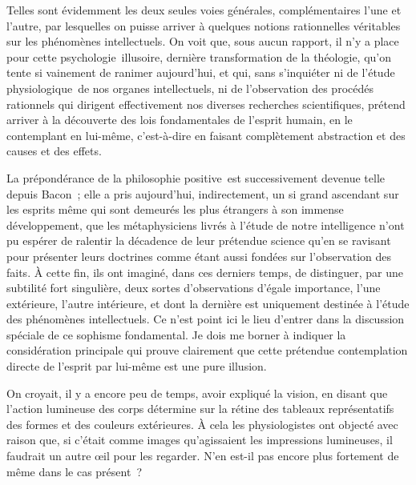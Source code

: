 \documentclass[french,twoside]{book} %
\begin{document}
Telles sont évidemment les deux seules voies générales, complémentaires l’une et l’autre, par lesquelles on puisse arriver à quelques notions rationnelles véritables sur les phénomènes intellectuels. On voit que, sous aucun rapport, il n’y a place pour cette psychologie illusoire, dernière transformation de la théologie, qu’on tente si vainement de ranimer aujourd’hui, et qui, sans s’inquiéter ni de l’étude physiologique de nos organes intellectuels, ni de l’observation des procédés rationnels qui dirigent effectivement nos diverses recherches scientifiques, prétend arriver à la découverte des lois fondamentales de l’esprit humain, en le contemplant en lui-même, c’est-à-dire en faisant complètement abstraction et des causes et des effets.\par
La prépondérance de la philosophie positive est successivement devenue telle depuis Bacon ; elle a pris aujourd’hui, indirectement, un si grand ascendant sur les esprits même qui sont demeurés les plus étrangers à son immense développement, que les métaphysiciens livrés à l’étude de notre intelligence n’ont pu espérer de ralentir la décadence de leur prétendue science qu’en se ravisant pour présenter leurs doctrines comme étant aussi fondées sur l’observation des faits. À cette fin, ils ont imaginé, dans ces derniers temps, de distinguer, par une subtilité fort singulière, deux sortes d’observations d’égale importance, l’une extérieure, l’autre intérieure, et dont la dernière est uniquement destinée à l’étude des phénomènes intellectuels. Ce n’est point ici le lieu d’entrer dans la discussion spéciale de ce sophisme fondamental. Je dois me borner à indiquer la considération principale qui prouve clairement que cette prétendue contemplation directe de l’esprit par lui-même est une pure illusion.\par
On croyait, il y a encore peu de temps, avoir expliqué la vision, en disant que l’action lumineuse des corps détermine sur la rétine des tableaux représentatifs des formes et des couleurs extérieures. À cela les physiologistes ont objecté avec raison que, si c’était comme images qu’agissaient les impressions lumineuses, il faudrait un autre œil pour les regarder. N’en est-il pas encore plus fortement de même dans le cas présent ?\par
\end{document}
